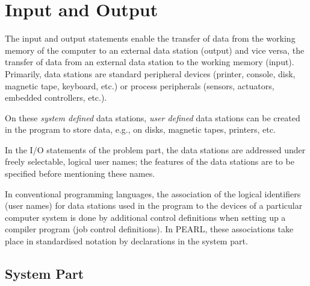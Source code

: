
\chapter{Input and Output}   %
\label{sec_input_output}
The input and output statements enable the transfer of data from the
working memory of the computer to an external data station (output) and
vice versa, the transfer of data from an external data station to the
working memory (input). Primarily, data stations are standard peripheral
devices (printer, console, disk, magnetic tape, keyboard, etc.) or
process peripherals (sensors, actuators, embedded controllers, etc.).

On these {\em system defined} data stations, {\em user defined} data
stations can be created in the program to store data, e.g., on disks,
magnetic tapes, printers, etc.

In the I/O statements of the problem part, the data stations are
addressed under freely selectable, logical user names; the features of
the data stations are to be specified before mentioning these names.

In conventional programming languages, the association of the logical
identifiers (user names) for data stations used in the program to the
devices of a particular computer system is done by additional control
definitions when setting up a compiler program (job control
definitions). In PEARL, these associations take place in standardised
notation by declarations in the system part.

\section{System Part}    %
\label{dation_system_part}

